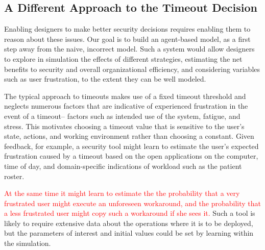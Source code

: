 \documentclass{acm_proc_article-sp}
\newcommand{\ignore}[1] {}
\begin{document}
\subsection{A Different Approach to the Timeout Decision}

Enabling designers to make better security decisions requires enabling
them to reason about these issues.  Our goal is to build an
agent-based model, as a first step away from the naive, incorrect
model. Such a system would allow designers to explore in simulation
the effects of different strategies, estimating the net benefits to
security and overall organizational efficiency, and considering
variables such as user frustration, to the extent they can be well
modeled.

\ignore{\subsection{An Alternative To The Standard Approach}}

The typical approach to timeouts makes use of a fixed timeout
threshold and neglects numerous factors that are indicative of 
experienced frustration in the event of a timeout-- factors such as 
intended use of the system, fatigue, and stress. 
This motivates choosing a timeout value that is sensitive to the
user's state, actions, and working environment rather than choosing a
constant. Given feedback, for example, a security tool might learn to
estimate the user's expected frustration caused by a timeout based on
the open applications on the computer, time of day, and
domain-specific indications of workload such as the patient roster. 
\ignore{At the same time it might learn to estimate the probability of a
vulnerability caused by a lengthened timeout in the same way and use
the two values to reason about the tradeoffs of user frustration and
near-term security.}
\textcolor{red}{At the same time it might learn to estimate the  
the probability that a very frustrated user might execute an unforeseen 
workaround, and the probability that a less frustrated user might copy 
such a workaround if she sees it.}
Such a tool is likely to require extensive data
about the operations where it is to be deployed, but the parameters of
interest and initial values could be set by learning within the
simulation.

\ignore{\subsection{Why Does It Take So Long To Recognize Workarounds?}}
\end{document}
